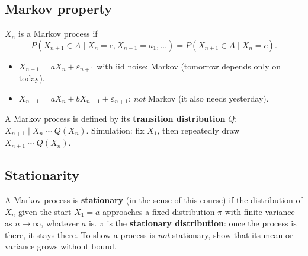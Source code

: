 \subsection{Markov property}
$X_n$ is a Markov process if
\[
P(X_{n+1}\in A\mid X_n = c, X_{n-1}=a_1,\dots) = P(X_{n+1}\in A\mid X_n = c).
\]
\begin{itemize}
  \item $X_{n+1} = aX_n + \varepsilon_{n+1}$ with iid noise: Markov (tomorrow depends only on today).
  \item $X_{n+1} = aX_n + bX_{n-1}+\varepsilon_{n+1}$: \emph{not} Markov (it also needs yesterday).
\end{itemize}
A Markov process is defined by its \textbf{transition distribution} $Q$: $X_{n+1}\mid X_n\sim Q(X_n)$. Simulation: fix $X_1$, then repeatedly draw $X_{n+1}\sim Q(X_n)$.

\subsection{Stationarity}
A Markov process is \textbf{stationary} (in the sense of this course) if the distribution of $X_n$ given the start $X_1=a$ approaches a fixed distribution $\pi$ with finite variance as $n\to\infty$, whatever $a$ is. $\pi$ is the \textbf{stationary distribution}: once the process is there, it stays there. To show a process is \emph{not} stationary, show that its mean or variance grows without bound.

